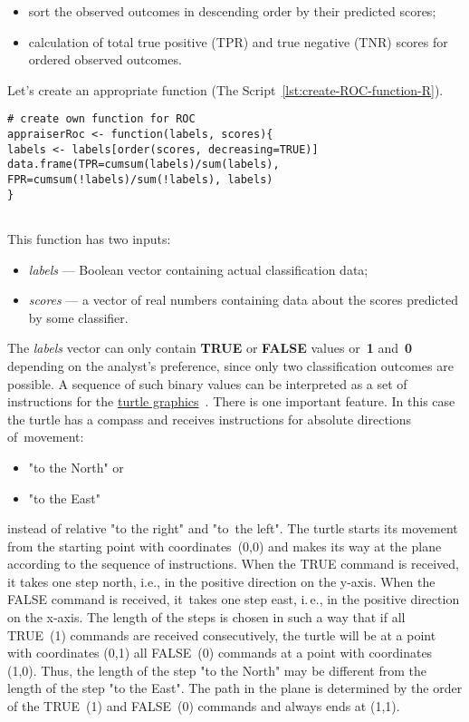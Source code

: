 \documentclass[]{scrreprt}
\begin{document}
\begin{itemize}
	\item sort the observed outcomes in descending order by their predicted scores;
	\item calculation of total true positive (TPR) and true negative (TNR) scores for ordered observed outcomes.
\end{itemize}
Let's create an appropriate function (The Script~\ref{lst:create-ROC-function-R}).
%
\begin{lstlisting}[float=htp, caption = Creating a~function to~calculate TPR and FPR, firstnumber=1, label= lst:create-ROC-function-R]
# create own function for ROC
appraiserRoc <- function(labels, scores){
labels <- labels[order(scores, decreasing=TRUE)]
data.frame(TPR=cumsum(labels)/sum(labels),
FPR=cumsum(!labels)/sum(!labels), labels)
}
 
\end{lstlisting}
%
This function has two inputs:
\begin{itemize}
	\item \emph{labels} --- Boolean vector containing actual classification data;
	\item \emph{scores} --- a vector of real numbers containing data about the scores predicted by some classifier.
\end{itemize}
%
The \emph{labels} vector can only contain \textbf{TRUE} or \textbf{FALSE} values or~\textbf{1} and~\textbf{0} depending on the analyst's preference, since only two classification outcomes are possible. A sequence of such binary values can be interpreted as a set of instructions for the \href{https://en.wikipedia.org/wiki/Turtle_graphics}{turtle graphics}~\cite{Wiki:turtle-graphics}. There is one important feature. In this case the turtle has a compass and receives instructions for absolute directions of~movement:
\begin{itemize}
	\item "to the North" or
	\item "to the East"
\end{itemize}
instead of relative "to the right" and "to~the left". The turtle starts its movement from the starting point with coordinates~(0,0) and makes its way at the plane according to the sequence of instructions. When the TRUE command is received, it takes one step north, i.e., in the positive direction on the y-axis. When the FALSE command is received, it~takes one step east, i.\,e., in the positive direction on the x-axis. The length of the steps is chosen in such a way that if all TRUE~(1) commands are received consecutively, the turtle will be at a point with coordinates (0,1) all FALSE~(0) commands at a point with coordinates (1,0). Thus, the length of the step "to the North" may be different from the length of the step "to the East". The path in the plane is determined by the order of the TRUE~(1) and FALSE~(0) commands and always ends at (1,1).
\end{document}
